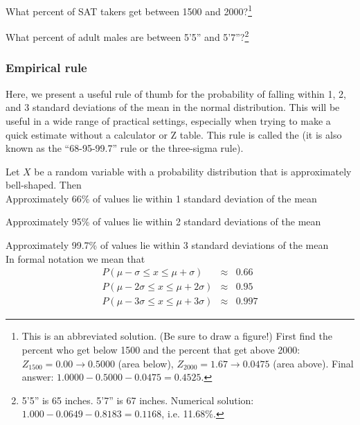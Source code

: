 \begin{exercise}
What percent of SAT takers get between 1500 and 2000?\footnote{This is an abbreviated solution. (Be sure to draw a figure!) First find the percent who get below 1500 and the percent that get above 2000: $Z_{1500} = 0.00 \to 0.5000$ (area below), $Z_{2000} = 1.67 \to 0.0475$ (area above). Final answer: $1.0000-0.5000 - 0.0475 = 0.4525$.}
\end{exercise}

\begin{exercise}
What percent of adult males are between 5'5'' and 5'7''?\footnote{5'5'' is 65 inches. 5'7'' is 67 inches. Numerical solution: $1.000 - 0.0649 - 0.8183 = 0.1168$, i.e. 11.68\%.}
\end{exercise}

\subsubsection{Empirical rule}

Here, we present a useful rule of thumb for the probability of falling within 1, 2, and 3 standard deviations of the mean in the normal distribution. This will be useful in a wide range of practical settings, especially when trying to make a quick estimate without a calculator or Z table.
This rule is called the  (it is also known as the ``68-95-99.7'' rule or the three-sigma rule).

\begin{termBox}{
Let $X$ be a random variable with a probability distribution that is approximately bell-shaped.
Then\\

\quad	Approximately 66\% of values lie within 1 standard deviation of the mean

\quad	Approximately 95\% of values lie within 2 standard deviations of the mean

\quad	Approximately 99.7\% of values lie within 3 standard deviations of the mean\\

In formal notation we mean that
\begin{eqnarray}
P (\mu - \sigma \leq x \leq \mu + \sigma)		& \approx & 0.66	\\
P (\mu - 2 \sigma \leq x \leq \mu + 2 \sigma)	& \approx & 0.95	\\
P (\mu - 3 \sigma \leq x \leq \mu + 3 \sigma)	& \approx & 0.997
\end{eqnarray}


}
\end{termBox}

